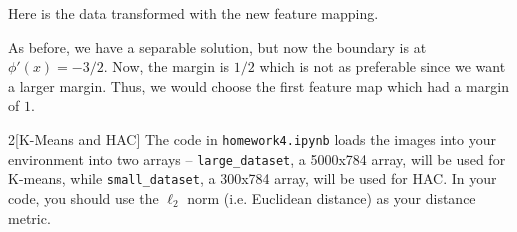 \documentclass[expanded]{lkx_pset}
\begin{document}
\begin{parts}
	Here is the data transformed with the new feature mapping.
	\begin{center}
	\end{center}
	As before, we have a separable solution, but now the boundary is at $\phi'(x)=-3/2$. Now, the margin is $1/2$ which is not as preferable since we want a larger margin. Thus, we would choose the first feature map which had a margin of $1$.
\end{parts}

\begin{problem}{2}[K-Means and HAC]
The code in \texttt{homework4.ipynb} loads the images into your environment into two arrays -- \texttt{large\_dataset}, a 5000x784 array, will be used for K-means, while \texttt{small\_dataset}, a 300x784 array, will be used for HAC. In your code, you should use the $\ell_2$ norm (i.e. Euclidean distance) as your distance metric.
\end{problem}
\end{document}
